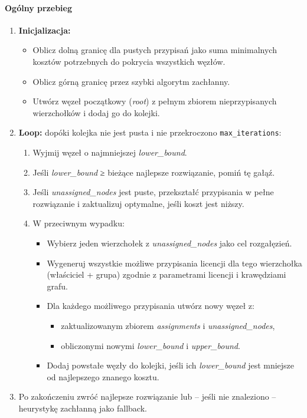 \paragraph{Ogólny przebieg}  
\begin{enumerate}
  \item \textbf{Inicjalizacja:}  
    \begin{itemize}
      \item Oblicz dolną granicę dla pustych przypisań jako suma minimalnych kosztów potrzebnych do pokrycia wszystkich węzłów.  
      \item Oblicz górną granicę przez szybki algorytm zachłanny.  
      \item Utwórz węzeł początkowy (\textit{root}) z pełnym zbiorem nieprzypisanych wierzchołków i dodaj go do kolejki.
    \end{itemize}
  \item \textbf{Loop:} dopóki kolejka nie jest pusta i nie przekroczono \texttt{max\_iterations}:
    \begin{enumerate}
      \item Wyjmij węzeł o najmniejszej \textit{lower\_bound}.
      \item Jeśli \textit{lower\_bound} ≥ bieżące najlepsze rozwiązanie, pomiń tę gałąź.
      \item Jeśli \textit{unassigned\_nodes} jest puste, przekształć przypisania w pełne rozwiązanie i zaktualizuj optymalne, jeśli koszt jest niższy.
      \item W przeciwnym wypadku:
        \begin{itemize}
          \item Wybierz jeden wierzchołek z \textit{unassigned\_nodes} jako cel rozgałęzień.
          \item Wygeneruj wszystkie możliwe przypisania licencji dla tego wierzchołka (właściciel + grupa) zgodnie z parametrami licencji i krawędziami grafu.
          \item Dla każdego możliwego przypisania utwórz nowy węzeł z:
            \begin{itemize}
              \item zaktualizowanym zbiorem \textit{assignments} i \textit{unassigned\_nodes},
              \item obliczonymi nowymi \textit{lower\_bound} i \textit{upper\_bound}.
            \end{itemize}
          \item Dodaj powstałe węzły do kolejki, jeśli ich \textit{lower\_bound} jest mniejsze od najlepszego znanego kosztu.
        \end{itemize}
    \end{enumerate}
  \item Po zakończeniu zwróć najlepsze rozwiązanie lub – jeśli nie znaleziono – heurystykę zachłanną jako fallback.
\end{enumerate}

